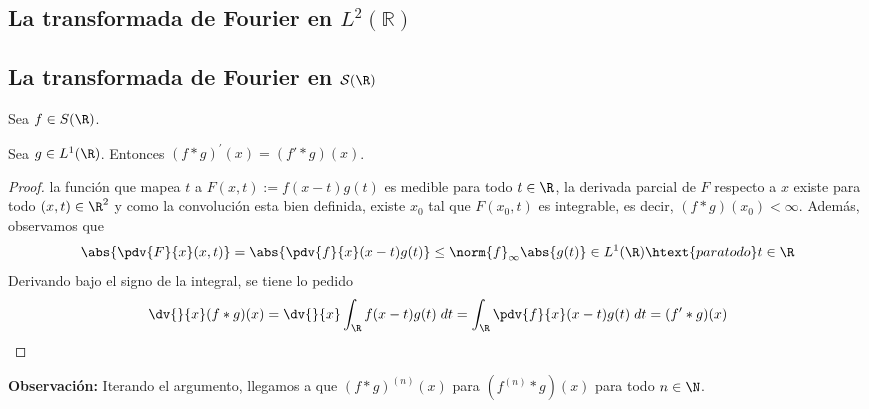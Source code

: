 \documentclass{article}
\begin{document}
\newpage
\subsection{La transformada de Fourier en \texorpdfstring{$L^{2}(\mathbb{R})$}{}}

\newpage
\subsection{La transformada de Fourier en \texorpdfstring{$\mathcal{S}(\R)$}{}}
\noindent Sea $f\in S(\R)$.
\begin{lema}
    Sea $g\in L^{1}(\R)$. Entonces $(f*g)^{'}(x)=(f'*g)(x)$.
\end{lema}
\begin{proof}
    la función que mapea $t$ a $F(x,t):=f(x-t)g(t)$ es medible para todo $t\in\R$, la derivada 
    parcial de $F$ respecto a $x$ existe para todo $(x,t)\in\R^{2}$ y como la convolución esta
    bien definida, existe $x_{0}$ tal que $F(x_{0},t)$ es integrable, es decir, 
    $(f*g)(x_{0})<\infty$. Además, observamos que
    \begin{equation*}
        \abs{\pdv{F}{x}(x,t)}=\abs{\pdv{f}{x}(x-t)g(t)}
        \leq\norm{f}_{\infty}\abs{g(t)}\in L^{1}(\R)
        \htext{para todo}t\in\R
    \end{equation*}
    Derivando bajo el signo de la integral, se tiene lo pedido
    \begin{equation*}
        \dv{}{x}(f*g)(x)=\dv{}{x}\int_{\R}f(x-t)g(t)\hspace{1mm}dt
        =\int_{\R}\pdv{f}{x}(x-t)g(t)\hspace{1mm}dt=(f'*g)(x)
    \end{equation*}
\end{proof}

\noindent\textbf{Observación:} Iterando el argumento, llegamos a que $(f*g)^{(n)}(x)$ para 
$(f^{(n)}*g)(x)$ para todo $n\in\N$.
\end{document}
